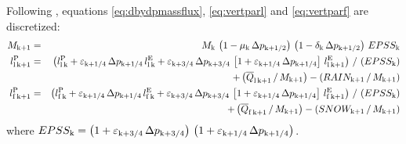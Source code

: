 \documentclass{UMDP_article}
\newcommand{\lsubsup}[2]{\ensuremath{l_{\rm{#1}}^{\rm{#2}}}}
\newcommand{\lc}{\left[}
\newcommand{\rc}{\right]}
\newcommand{\ov}{\overline}
\newcommand{\lp}{\left(}
\newcommand{\rp}{\right)}
\begin{document}
Following , equations \ref{eq:dbydpmassflux}, \ref{eq:vertparl} and
\ref{eq:vertparf} are discretized:
% 
\begin{eqnarray}
M_{\rm{k} + 1} & = & M_{\rm{k}} \, 
\lp { 1 - \mu_{\rm{k}} \, \Delta p_{\rm{k} + 1 / 2} } \rp \,
\lp { 1 - \delta_{\rm{k}} \, \Delta p_{\rm{k} + 1 / 2} } \rp \,
EPSS_{\rm{k}}  \label{eq:discdmfbydp} \\
\lsubsup{l \, k + 1}{P} & = & \lp { 
\lsubsup{l \, k}{P} +  
\varepsilon_{\rm{k} + 1/4} \, \Delta p_{\rm{k} + 1/4} \, \lsubsup{l \, k}{E} +
\varepsilon_{\rm{k} + 3/4} \, \Delta p_{\rm{k} + 3/4} \, 
\lc {1 + \varepsilon_{\rm{k} + 1 / 4} \, \Delta p_{\rm{k} + 1 / 4}} \rc \,
\lsubsup{l \, k + 1}{E}
} \rp \, / \, \lp {EPSS_{\rm{k}}} \rp  \nonumber \\
{ } & { } & + \lp { {\ov{Q}}_{\rm{l} \, \rm{k} + 1} \, / \, M_{\rm{k} + 1}} \rp 
- \lp { RAIN_{\rm{k} + 1} \, / \, M_{\rm{k} + 1} } \rp
\label{eq:discvparl} \\
\lsubsup{f \, k + 1}{P} & = & \lp { 
\lsubsup{f \, k}{P} + 
\varepsilon_{\rm{k} + 1/4} \, \Delta p_{\rm{k} + 1/4} \, \lsubsup{f \, k}{E} +
\varepsilon_{\rm{k} + 3/4} \, \Delta p_{\rm{k} + 3/4} \, 
\lc {1 + \varepsilon_{\rm{k} + 1 / 4} \, \Delta p_{\rm{k} + 1 / 4}} \rc \,
\lsubsup{f \, k + 1}{E}
} \rp \, / \, \lp {EPSS_{\rm{k}}} \rp  \nonumber \\
{ } & { } & + \lp { {\ov{Q}}_{\rm{f} \, \rm{k} + 1} \, / \, M_{\rm{k} + 1}} \rp 
- \lp { SNOW_{\rm{k} + 1} \, / \, M_{\rm{k} + 1} } \rp
\label{eq:discvparf}
\end{eqnarray}
%
where $EPSS_{\rm{k}} = 
\lp {1 + \varepsilon_{\rm{k} + 3 / 4} \, \Delta p_{\rm{k} + 3 / 4}} \rp \, 
\lp {1 + \varepsilon_{\rm{k} + 1 / 4} \, \Delta p_{\rm{k} + 1 / 4}} \rp $.
\end{document}
